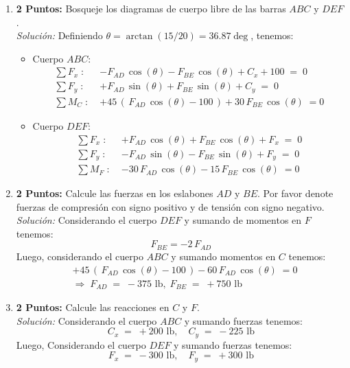 \documentclass[ a4paper, twoside, 11pt]{article}
\begin{document}
\begin{problem}
\begin{enumerate}[label=\textbf{\alph*)}]
\item \textbf{2 Puntos:} Bosqueje los diagramas de cuerpo libre de las barras $ABC$ y $DEF$. \\[1ex] \emph{Soluci\'on:} Definiendo $\theta = \arctan( 15 / 20 ) = 36.87\deg$, tenemos: 
\begin{itemize}
\item Cuerpo $ABC$: 
\begin{align*}
\sum F_x \; \colon \;
& -F_{AD} \, \cos(\theta) - F_{BE} \, \cos(\theta) + C_x + 100 \; = \; 0 \\[1ex]
\sum F_y \; \colon \;
& +F_{AD} \, \sin(\theta) + F_{BE} \, \sin(\theta) + C_y \; = \; 0 \\[1ex]
\sum M_C \; \colon \;
& +45 \, ( \, F_{AD} \, \cos(\theta) - 100 \, ) + 30 \, F_{BE} \, \cos(\theta) \; = 0
\end{align*}
\item Cuerpo $DEF$: 
\begin{align*}
\sum F_x \; \colon \;
& +F_{AD} \, \cos(\theta) + F_{BE} \, \cos(\theta) + F_x \; = \; 0 \\[1ex]
\sum F_y \; \colon \;
& -F_{AD} \, \sin(\theta) - F_{BE} \, \sin(\theta) + F_y \; = \; 0 \\[1ex]
\sum M_F \; \colon \;
& -30 \, F_{AD} \, \cos(\theta) - 15 \, F_{BE} \, \cos(\theta) \; = 0
\end{align*}
\end{itemize}

\item \textbf{2 Puntos:} Calcule las fuerzas en los eslabones $AD$ y $BE$. Por favor denote fuerzas de compresi\'on con signo positivo y de tensi\'on con signo negativo. \\[1ex] \emph{Soluci\'on:} Considerando el cuerpo $DEF$ y sumando de momentos en $F$ tenemos: 
\[
F_{BE} = -2 \, F_{AD}
\]
Luego, considerando el cuerpo $ABC$ y sumando momentos en $C$ tenemos: 
\begin{align*}
& +45 \, ( \, F_{AD} \, \cos(\theta) - 100 \, ) - 60 \, F_{AD} \, \cos(\theta) \; = 0 \\
& \Longrightarrow \;
F_{AD} \; = \; -375 \text{ lb}, \;
F_{BE} \; = \; +750 \text{ lb}
\end{align*}

\item \textbf{2 Puntos:} Calcule las reacciones en $C$ y $F$. \\[1ex] \emph{Soluci\'on:} Considerando el cuerpo $ABC$ y sumando fuerzas tenemos: 
\[
C_x \; = \; +200 \text{ lb}, \quad
C_y \; = \; -225 \text{ lb}
\]
Luego, Considerando el cuerpo $DEF$ y sumando fuerzas tenemos: 
\[
F_x \; = \; -300 \text{ lb}, \quad
F_y \; = \; +300 \text{ lb}
\]

\end{enumerate}

\end{problem}
\fullskip
\end{document}
